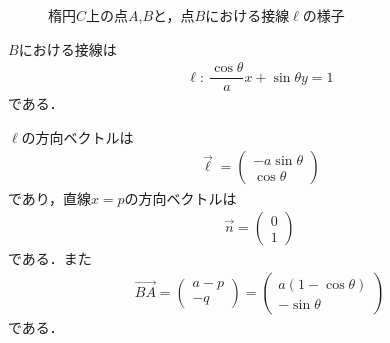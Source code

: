\documentclass[../../main.tex]{subfiles}
\begin{document}
\begin{figure}[htbp]
  \caption{楕円$C$上の点$A$,$B$と，点$B$における接線$\ell$の様子}
\end{figure}

$B$における接線は
\begin{align}
  \ell:\ \dfrac{\cos\theta}{a}x+\sin\theta y=1 \label{eq:2}
\end{align}
である．

$\ell$の方向ベクトルは
\begin{align}
  \vec\ell=
  \begin{pmatrix}
    -a\sin\theta \\
    \cos\theta
  \end{pmatrix}
\end{align}
であり，直線$x=p$の方向ベクトルは
\begin{align}
  \vec{n} =
  \begin{pmatrix}
    0 \\
    1
  \end{pmatrix}
\end{align}
である．また
\begin{align}
  \overrightarrow{BA} =
  \begin{pmatrix}
    a-p \\
    -q
  \end{pmatrix}
  =
  \begin{pmatrix}
    a(1-\cos\theta) \\
    -\sin\theta
  \end{pmatrix}
\end{align}
である．
\end{document}
